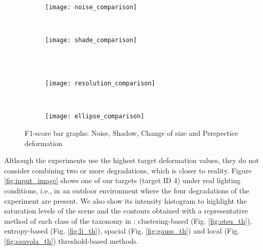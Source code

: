 \begin{figure}[!ht]
    \centering
    \begin{subfigure}[b]{0.4\textwidth}
        \texttt{[image: noise\_comparison]}
        \caption{}
        \label{fig:noise_graph}
    \end{subfigure}
        ~ %
    \begin{subfigure}[b]{0.4\textwidth}
        \texttt{[image: shade\_comparison]}
        \caption{}
        \label{fig:shadow_graph}
    \end{subfigure}\\
        ~ %
    \begin{subfigure}[b]{0.4\textwidth}
        \texttt{[image: resolution\_comparison]}
        \caption{}
        \label{fig:resolution_graph}
    \end{subfigure}
        ~ %
    \begin{subfigure}[b]{0.4\textwidth}
        \texttt{[image: ellipse\_comparison]}
        \caption{}
        \label{fig:deformation_graph}
    \end{subfigure}
    \caption{F1-score bar graphs:  Noise,  Shadow,  Change of size and  Perspectice deformation}\label{fig:degradations_graphs}
\end{figure}

Although the experiments use the highest target deformation values, they do not consider combining two or more degradations, which is closer to reality. Figure \ref{fig:input_image} shows one of our targets (target ID 4) under real lighting conditions, i.e., in an outdoor environment where the four degradations of the experiment are present. We also show its intensity histogram to highlight the saturation levels of the scene and the contours obtained with a representative method of each class of the taxonomy in \citep{Sezgin.Sankur:EI:2010}: clustering-based (Fig. \ref{fig:otsu_th}), entropy-based (Fig. \ref{fig:li_th}), spacial (Fig. \ref{fig:gauss_th}) and local (Fig. \ref{fig:sauvola_th}) threshold-based methods. 


